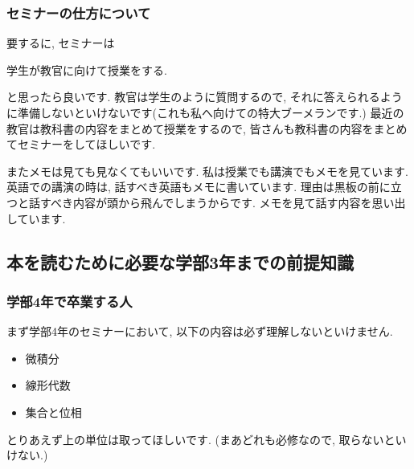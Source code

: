 \begin{comment}
最後になぜこんなことを言うかといいますと, 無責任に「河東先生のセミナーの準備の仕方について」のページを教える人が多いと思ったからです.
この方法を教える人には
\begin{tcolorbox}[mybox]
\begin{center}
そう言うあなたは講演や授業で, 河東先生のように準備ができていますか?
\end{center}
\end{tcolorbox}
と問いたいです. 

河東先生はできるんです. YouTubeで河東先生の授業を見たが本当にできています. すごいとしか言えません. 
私には到底できないので, 上の方法(河東先生のセミナーの準備の方法)を押し付ける気は全くないです. 
\end{comment}
\subsubsection{セミナーの仕方について}

要するに, セミナーは
\begin{tcolorbox}[mybox]
\begin{center}
学生が教官に向けて授業をする.
\end{center}
\end{tcolorbox}
と思ったら良いです.  
教官は学生のように質問するので, それに答えられるように準備しないといけないです(これも私へ向けての特大ブーメランです.)
最近の教官は教科書の内容をまとめて授業をするので, 皆さんも教科書の内容をまとめてセミナーをしてほしいです. 

またメモは見ても見なくてもいいです. 私は授業でも講演でもメモを見ています. 英語での講演の時は, 話すべき英語もメモに書いています. 
理由は黒板の前に立つと話すべき内容が頭から飛んでしまうからです. メモを見て話す内容を思い出しています. 

\subsection{本を読むために必要な学部3年までの前提知識}
\label{subsec-class}

\subsubsection{学部4年で卒業する人}
まず学部4年のセミナーにおいて, 以下の内容は必ず理解しないといけません. 
\vspace{-8pt}
\begin{itemize}[left=0pt]
  \setlength{\parskip}{0cm} %
  \setlength{\itemsep}{0cm} %
  \item 微積分
  \item 線形代数
 \item 集合と位相
\end{itemize}
とりあえず上の単位は取ってほしいです. (まあどれも必修なので, 取らないといけない.)

